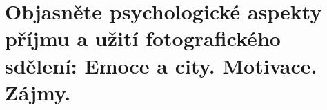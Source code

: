 \section{Objasněte psychologické aspekty příjmu a užití fotografického sdělení: Emoce a city. Motivace. Zájmy.}